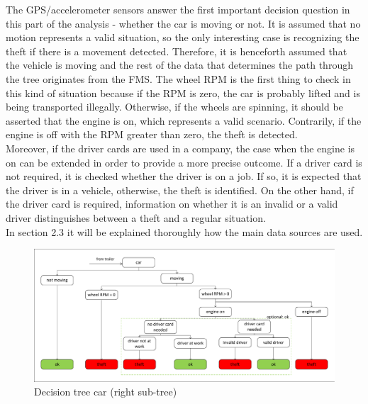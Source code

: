 The GPS/accelerometer sensors answer the first important decision question in this part of the analysis - whether the car is moving or not. It is assumed that no motion represents a valid situation, so the only interesting case is recognizing the theft if there is a movement detected. Therefore, it is henceforth assumed that the vehicle is moving and the rest of the data that determines the path through the tree originates from the FMS. The wheel RPM is the first thing to check in this kind of situation because if the RPM is zero, the car is probably lifted and is being transported illegally. Otherwise, if the wheels are spinning, it should be asserted that the engine is on, which represents a valid scenario. Contrarily, if the engine is off with the RPM greater than zero, the theft is detected.\\
Moreover, if the driver cards are used in a company, the case when the engine is on can be extended in order to provide a more precise outcome. If a driver card is not required, it is checked whether the driver is on a job. If so, it is expected that the driver is in a vehicle, otherwise, the theft is identified. On the other hand, if the driver card is required, information on whether it is an invalid or a valid driver distinguishes between a theft and a regular situation. \\
In section 2.3 it will be explained thoroughly how the main data sources are used.

\begin{figure} [h]
    \includegraphics[clip, trim=0.1cm 0.1cm 0.1cm 0.1cm, width=1\textwidth]{src/pic/DecisionTreeCar}
    \caption{Decision tree car (right sub-tree)}
    \label{fig::decisionTreeCar}
\end{figure}

